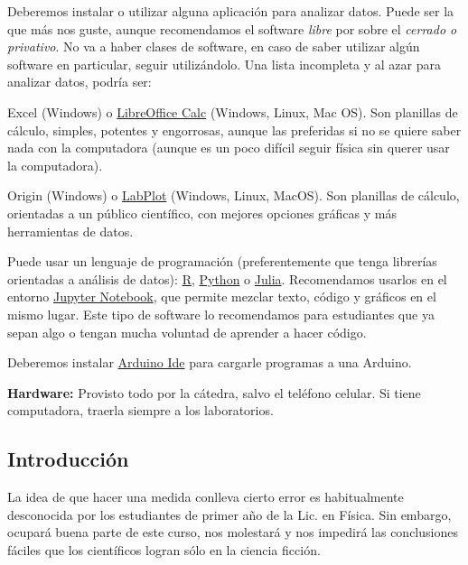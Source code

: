 \documentclass[10pt,a4paper]{article}
\numberwithin{equation}{section}%
\numberwithin{equation}{subsection}
\begin{document}
\begin{outline}[enumerate]
\1 Deberemos instalar o utilizar alguna aplicación para analizar datos. Puede ser la que más nos guste, aunque recomendamos el software \textit{libre} por sobre el \textit{cerrado o privativo}. No va a haber clases de software, en caso de saber utilizar algún software en particular, seguir utilizándolo. Una lista incompleta y al azar para analizar datos, podría ser:

  \2 Excel (Windows) o \href{https://es.libreoffice.org/descarga/libreoffice/}{LibreOffice Calc} (Windows, Linux, Mac OS). Son planillas de cálculo, simples, potentes y engorrosas, aunque las preferidas si no se quiere saber nada con la computadora (aunque es un poco difícil seguir física sin querer usar la computadora).

  \2 Origin (Windows) o \href{https://labplot.kde.org/}{LabPlot} (Windows, Linux, MacOS). Son planillas de cálculo, orientadas a un público científico, con mejores opciones gráficas y más herramientas de datos.

 \2 Puede usar un lenguaje de programación (preferentemente que tenga librerías orientadas a análisis de datos): \href{https://www.r-project.org/}{R}, \href{https://www.python.org/}{Python} o \href{https://julialang.org/}{Julia}. Recomendamos usarlos en el entorno \href{https://jupyter.org/}{Jupyter Notebook}, que permite mezclar texto, código y gráficos en el mismo lugar. Este tipo de software lo recomendamos para estudiantes que ya sepan algo o tengan mucha voluntad de aprender a hacer código.

\1 Deberemos instalar \href{https://www.arduino.cc/en/software}{Arduino Ide} para cargarle programas a una Arduino.

\end{outline}


\noindent \textbf{Hardware:} Provisto todo por la cátedra, salvo el teléfono celular. Si tiene computadora, traerla siempre a los laboratorios.

\pagebreak

\subsection*{Introducción}

La idea de que hacer una medida conlleva cierto error es habitualmente desconocida por los estudiantes de primer año de la Lic. en Física. Sin embargo, ocupará buena parte de este curso, nos molestará y nos impedirá las conclusiones fáciles que los científicos logran sólo en la ciencia ficción.
\end{document}
